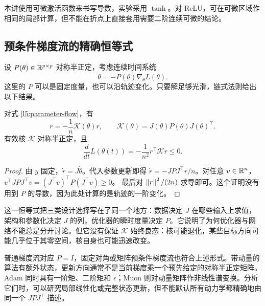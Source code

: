 本讲使用可微激活函数来书写导数，实验采用 $\tanh$。对 ReLU，可在可微区域作相同的局部计算，但不能在折点上直接套用需要二阶连续可微的结论。

\subsection{预条件梯度流的精确恒等式}

设 $P(\theta)\in\mathbb R^{p\times p}$ 对称半正定，考虑连续时间系统
\begin{equation}
 \dot\theta=-P(\theta)\nabla_\theta L(\theta).
 \label{l5:parameter-flow}
\end{equation}
这里的 $P$ 可以是固定度量，也可以沿轨迹变化。只要解足够光滑，链式法则给出以下结果。

\begin{proposition}[预测空间中的有效核]
对式 \eqref{l5:parameter-flow}，有
\begin{equation}
 \dot r=-\frac1n\mathcal K(\theta)r,
 \qquad
 \boxed{\mathcal K(\theta)=J(\theta)P(\theta)J(\theta)^\top}.
 \label{l5:effective-kernel}
\end{equation}
有效核 $\mathcal K$ 对称半正定，且
\begin{equation}
 \frac{d}{dt}L(\theta(t))
 =-\frac1{n^2}r^\top\mathcal K r\leq0.
 \label{l5:loss-flow}
\end{equation}
\end{proposition}

\begin{proof}
由 $y$ 固定，$\dot r=J\dot\theta$。代入参数更新即得
$\dot r=-JPJ^\top r/n$。对任意 $v\in\mathbb R^n$，
$v^\top JPJ^\top v=(J^\top v)^\top P(J^\top v)\geq0$。
最后对 $\left\lVert r\right\rVert^2/(2n)$ 求导即可。这个证明没有用到 $P$ 的导数，因为此处计算的是轨迹的一阶变化。
\end{proof}

这一恒等式把三类设计选择写在了同一个地方：数据决定 $J$ 在哪些输入上求值，架构和参数化决定 $J$ 的列，优化器的瞬时度量决定 $P$。它说明了为何优化器与网络不能总是分开讨论。但它没有保证 $\mathcal K$ 始终良态：核可能退化，某些目标方向可能几乎位于其零空间，核自身也可能迅速改变。

\begin{remark}[哪些算法可以直接使用这个公式]
普通梯度流对应 $P=I$，固定对角或矩阵预条件梯度流也符合上述形式。带动量的算法有额外状态，更新方向通常不是当前梯度乘一个预先给定的对称半正定矩阵。Adam 同时具有一阶矩、二阶矩和 $\epsilon$；Muon 则对动量矩阵作非线性谱变换。分析它们时，可以研究局部线性化或完整状态更新，但不能默认所有动力学都精确地由同一个 $JPJ^\top$ 描述。
\end{remark}

